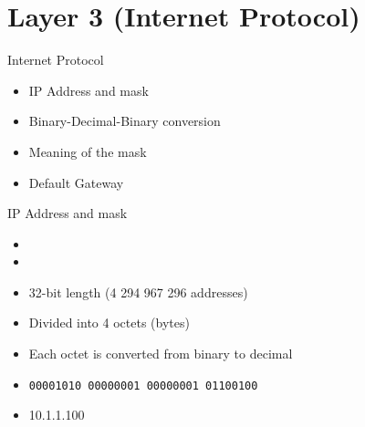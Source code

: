 \section[ipv4]{Layer 3 (Internet Protocol)}

\begin{frame}{Internet Protocol}
	\begin{itemize}
		\item IP Address and mask
		\item Binary-Decimal-Binary conversion
		\item Meaning of the mask
		\item Default Gateway
	\end{itemize}
\end{frame}

\begin{frame}{IP Address and mask}
	\begin{itemize}[<+->]
		\item {}
		\item {}
		\item 32-bit length (4 294 967 296 addresses)
		\item Divided into 4 octets (bytes)
		\item Each octet is converted from binary to decimal
		\item \texttt{00001010 00000001 00000001 01100100}
		\item 10.1.1.100
	\end{itemize}
\end{frame}

